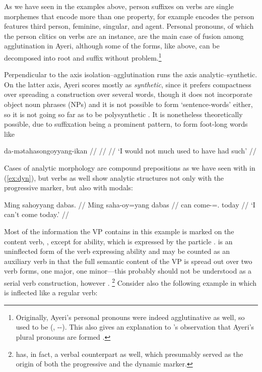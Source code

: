 As we have seen in the examples above, person suffixes on verbs are single 
morphemes that encode more than one property, for example  
encodes the person features third person, feminine, singular, and agent. 
Personal pronouns, of which the person clitics on 
verbs are an instance, are the main case of fusion among agglutination in 
Ayeri, although some of the forms, like  above, can 
be decomposed into root and suffix without problem.\footnote{Originally, 
Ayeri's personal pronouns were indeed agglutinative as well, so 
 used to be  (, 
\Tsg{}-\F{}-\Aarg{}). This also gives an explanation to \citet{boga2016}'s 
observation that Ayeri's plural pronouns are formed .}

Perpendicular to the axis isolation–agglutination runs the axis 
analytic–syn\-thetic. On the latter axis, Ayeri scores mostly as 
\emph{synthetic}, since it prefers compactness over spreading a construction 
over several words, though it does not incorporate object noun phrases (NPs) 
and it is not possible to form `sentence-words' either, so it is not going so 
far as to be poly\-syn\-thetic \citep[45--46]{comrie1989}. It is nonetheless 
theoretically possible, due to suffixation being a prominent pattern, to form 
foot-long words like

\ex\label{ex:footlong}\begingl
	\gla da-mətahasongoyyang-ikan //
	 //
	 //
	\glft `I would not much used to have had such' //
\endgl\xe

Cases of analytic morphology are compound prepositions as we have seen 
with  in (\ref{ex:dyn}), but verbs as well 
show analytic structures not only with the progressive marker, but also with 
modals:

\ex\begingl
	\gla Ming sahoyyang dabas. //
	\glb Ming saha-oy=yang dabas //
	\glc can come-\Neg{}=\Fsg{}.\Aarg{} today //
	\glft `I can't come today.' //
\endgl\xe

Most of the information the VP contains in this example is marked on the
content verb, , except for ability, which is expressed
by the particle .  is an uninflected
form of the verb expressing ability and may be counted as an auxiliary verb in
that the full semantic content of the VP is spread out over two verb forms, one
major, one minor---this probably should not be understood as a serial verb
construction, however \citep{aikhenvald2006}.%
\footnote{ has, in fact, a verbal counterpart 
 as well, which presumably served as the 
origin of both the progressive and the dynamic marker.\label{fn:mangaverb}}
Consider also the following example in which  is inflected
like a regular verb:

